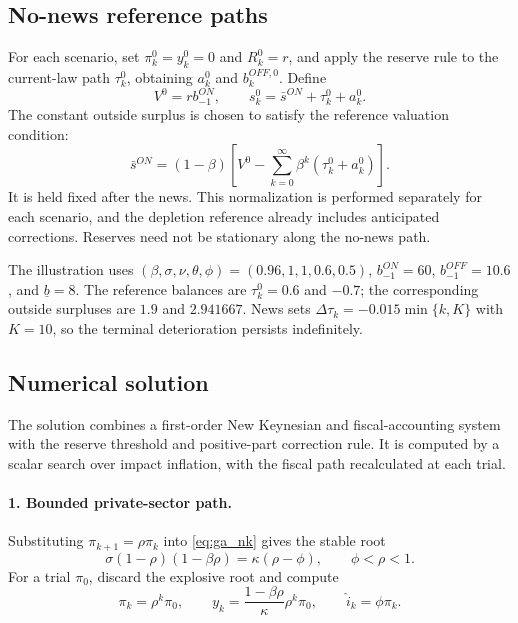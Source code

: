\documentclass[12pt]{article}%
\theoremstyle{remark}
\begin{document}
\subsection{No-news reference paths}
For each scenario, set $\pi_k^0=y_k^0=0$ and $R_k^0=r$, and apply the reserve rule to the current-law path $\tau_k^0$, obtaining $a_k^0$ and $b_k^{OFF,0}$. Define
\begin{equation}
 V^0=rb_{-1}^{ON},\qquad
 s_k^0=\bar s^{ON}+\tau_k^0+a_k^0.
 \label{eq:ga_reference_surplus}
\end{equation}
The constant outside surplus is chosen to satisfy the reference valuation condition:
\begin{equation}
 \bar s^{ON}=(1-\beta)\left[
 V^0-\sum_{k=0}^{\infty}\beta^k(\tau_k^0+a_k^0)\right].
 \label{eq:ga_reference}
\end{equation}
It is held fixed after the news. This normalization is performed separately for each scenario, and the depletion reference already includes anticipated corrections. Reserves need not be stationary along the no-news path.

The illustration uses $(\beta,\sigma,\nu,\theta,\phi)=(0.96,1,1,0.6,0.5)$, $b_{-1}^{ON}=60$, $b_{-1}^{OFF}=10.6$, and $\underline b=8$. The reference balances are $\tau_k^0=0.6$ and $-0.7$; the corresponding outside surpluses are $1.9$ and $2.941667$. News sets $\Delta\tau_k=-0.015\min\{k,K\}$ with $K=10$, so the terminal deterioration persists indefinitely.

\subsection{Numerical solution}
The solution combines a first-order New Keynesian and fiscal-accounting system with the reserve threshold and positive-part correction rule. It is computed by a scalar search over impact inflation, with the fiscal path recalculated at each trial.

\paragraph{1. Bounded private-sector path.}
Substituting $\pi_{k+1}=\rho\pi_k$ into \eqref{eq:ga_nk} gives the stable root
\begin{equation}
 \sigma(1-\rho)(1-\beta\rho)=\kappa(\rho-\phi),
 \qquad \phi<\rho<1.
 \label{eq:ga_root}
\end{equation}
For a trial $\pi_0$, discard the explosive root and compute
\begin{equation}
 \pi_k=\rho^k\pi_0,\qquad
 y_k=\frac{1-\beta\rho}{\kappa}\rho^k\pi_0,
 \qquad\widehat i_k=\phi\pi_k.
 \label{eq:ga_bounded_path}
\end{equation}
\end{document}
